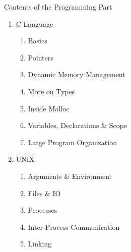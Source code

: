 \documentclass[10pt]{beamer}
\begin{document}
 \begin{frame}[allowframebreaks]{Contents of the Programming Part}
    \begin{enumerate}
    \item C Language
        \begin{enumerate}
        \item Basics
        \item Pointers
        \item Dynamic Memory Management
        \item More on Types
        \item Inside Malloc
        \item Variables, Declarations \& Scope
        \item Large Program Organization
        \end{enumerate}
    \item UNIX
        \begin{enumerate}
            \item Arguments \& Environment
            \item Files \& IO
            \item Processes
            \item Inter-Process Communication
            \item Linking
        \end{enumerate}
    \end{enumerate}
 \end{frame}
 
 
\end{document}
